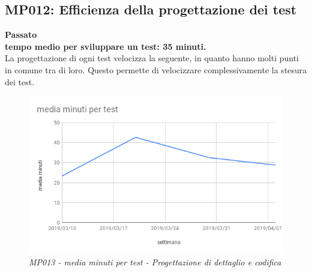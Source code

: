 \subsection{MP012: Efficienza della progettazione dei test}
\textbf{Passato}\\
\textbf{tempo medio per sviluppare un test: 35 minuti.}\\
La progettazione di ogni test velocizza la seguente, in quanto hanno molti punti in comune tra di loro. Questo permette di velocizzare complessivamente la stesura dei test.
\begin{figure} [H]
    \centering
	\includegraphics[scale=0.4]{./images/mediatestPDC.png}
    \caption{\textit{MP013 - media minuti per test - Progettazione di dettaglio e codifica}}\label{}
\end{figure}

